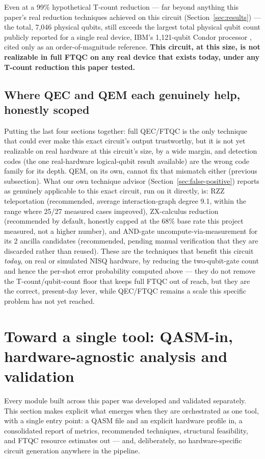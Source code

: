 \documentclass[9pt,twocolumn]{extarticle}
\begin{document}
Even at a 99\% hypothetical T-count reduction --- far beyond anything this
paper's real reduction techniques achieved on this circuit (Section~\ref{sec:results}) ---
the total, 7{,}046 physical qubits, still exceeds the largest total
physical qubit count publicly reported for a single real device,
IBM's 1{,}121-qubit Condor processor \cite{ibmcondor2023}, cited only as an
order-of-magnitude reference. \textbf{This circuit, at this size, is not
realizable in full FTQC on any real device that exists today, under any T-count
reduction this paper tested.}

\subsection{Where QEC and QEM each genuinely help, honestly scoped}
Putting the last four sections together: full QEC/FTQC is the only
technique that could ever make this exact circuit's output trustworthy,
but it is not yet realizable on real hardware at this circuit's size, by
a wide margin, and detection codes (the one real-hardware logical-qubit
result available) are the wrong code family for its depth. QEM, on its
own, cannot fix that mismatch either (previous subsection). What our own
technique advisor (Section~\ref{sec:false-positive}) reports as genuinely
applicable to this exact circuit, run on it directly, is: RZZ
teleportation (recommended, average interaction-graph degree 9.1, within
the range where 25/27 measured cases improved), ZX-calculus reduction
(recommended by default, honestly capped at the 68\% base rate this
project measured, not a higher number), and AND-gate uncompute-via-measurement
for its 2 ancilla candidates (recommended, pending manual verification
that they are discarded rather than reused). These are the techniques that
benefit this circuit \emph{today}, on real or simulated NISQ hardware, by
reducing the two-qubit-gate count and hence the per-shot error probability
computed above --- they do not remove the T-count/qubit-count floor that
keeps full FTQC out of reach, but they are the correct, present-day lever,
while QEC/FTQC remains a scale this specific problem has not yet reached.

\section{Toward a single tool: QASM-in, hardware-agnostic analysis and validation}
\label{sec:qasm-tool}
Every module built across this paper was developed and validated
separately. This section makes explicit what emerges when they are
orchestrated as one tool, with a single entry point: a QASM file and an
explicit hardware profile in, a consolidated report of metrics,
recommended techniques, structural feasibility, and FTQC resource
estimates out --- and, deliberately, no hardware-specific circuit
generation anywhere in the pipeline.
\end{document}
